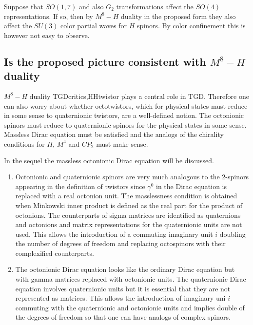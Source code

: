 \documentclass[10pt,epsf]{article}
\begin{document}
{\begin{enumerate}
Suppose that $SO(1,7)$ and also $G_2$ transformations affect the $SO(4)$  representations. If so, then by $M^8-H$ duality in the proposed  form they also  affect the $SU(3)$ color partial waves for $H$ spinors. By color confinement this is however not easy to observe.

\end{enumerate}



\subsection{Is the proposed picture consistent with $M^8-H$ duality}


$M^8-H$ duality \cite{btart}{TGDcritics,HHtwistor} plays a central role in TGD. Therefore one can also worry about whether    octotwistors, which for physical states must reduce in some sense to quaternionic twistors, are a well-defined notion. The octonionic spinors must reduce to quaternionic spinors for the physical states in some sense. Massless Dirac equation must be satisfied and the  analogs of the  chirality conditions for $H$, $M^4$ and $CP_2$  must make sense.

In the sequel the   massless  octonionic Dirac equation will  be discussed. 

\begin{enumerate}

\item Octonionic and quaternionic spinors are very much analogous to the 2-spinors appearing in the definition of twistors since $\gamma^0$ in the Dirac equation is replaced with a real octonion unit. The masslessness condition is obtained when Minkowski inner product is defined as the real part for the product of octonions. The  counterparts of sigma matrices are identified as quaternions and octonions and matrix representations for the quaternionic units are not used. This allows the introduction of a  commuting imaginary unit $i$ doubling the number of degrees of freedom and replacing octospinors with their complexified counterparts.

\item The octonionic Dirac equation  looks like  the ordinary Dirac equation but with gamma matrices replaced with octonionic units. The quaternionic Dirac equation involves quaternionic units but it is essential that they are not represented as matrices. This allows the introduction of imaginary uni $i$ commuting with the quaternionic and octonionic units and implies double of the degrees of freedom so that one can have analogs of complex spinors.


\end{enumerate}}
\end{document}
